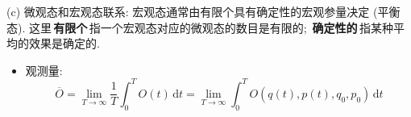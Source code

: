 (c) 微观态和宏观态联系: 宏观态通常由有限个具有确定性的宏观参量决定 (平衡态). 这里\,\textbf{有限个}\,指一个宏观态对应的微观态的数目是有限的; \,\textbf{确定性的}\,指某种平均的效果是确定的.
\begin{itemize}
    \item 观测量:
    \begin{equation}
        \overline{O} = \lim_{T \rightarrow \infty} \dfrac{1}{T} \int_{0}^{T} O(t) \,\mathrm{d} t = \lim_{T \rightarrow \infty} \int_{0}^{T} O(q(t), p(t), q_0, p_0) \,\mathrm{d} t
    \end{equation}
\end{itemize}
